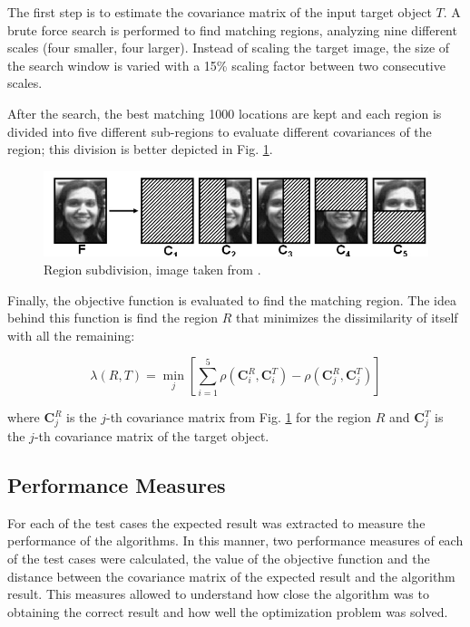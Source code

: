 \documentclass[11pt]{article}
\theoremstyle{definition}
\theoremstyle{remark}
\theoremstyle{remark}
\theoremstyle{remark}
\begin{document}
The first step is to estimate the covariance matrix of the input target object
$T$. A brute force search is performed to find matching regions, analyzing nine
different scales (four smaller, four larger). Instead of scaling the target
image, the size of the search window is varied with a 15\% scaling factor
between two consecutive scales.

After the search, the best matching 1000 locations are kept and each region is
divided into five different sub-regions to evaluate different covariances of the
region; this division is better depicted in Fig. \ref{fig:regions}.

\begin{figure}[H]
  \centering \includegraphics[scale=.6]{figs/regions.png}
  \caption{Region subdivision, image taken from \parencite{tuzel2006}.}
  \label{fig:regions}
\end{figure}

Finally, the objective function is evaluated to find the matching region. The
idea behind this function is find the region $R$ that minimizes the
dissimilarity of itself with all the remaining:

\begin{equation*}
  \lambda(R, T)=\min _{j}\left[\sum_{i=1}^{5} \rho\left(\mathbf{C}_{i}^{R}, \mathbf{C}_{i}^{T}\right)-\rho\left(\mathbf{C}_{j}^{R}, \mathbf{C}_{j}^{T}\right)\right]
\end{equation*}

where $\mathbf{C}_j^R$ is the $j$-th covariance matrix from Fig.
\ref{fig:regions} for the region $R$ and $\mathbf{C}_j^T$ is the $j$-th
covariance matrix of the target object.

\subsection{Performance Measures}
For each of the test cases the expected result was extracted to measure the
performance of the algorithms. In this manner, two performance measures of each
of the test cases were calculated, the value of the objective function and the
distance between the covariance matrix of the expected result and the algorithm
result. This measures allowed to understand how close the algorithm was to
obtaining the correct result and how well the optimization problem was solved.
\end{document}
